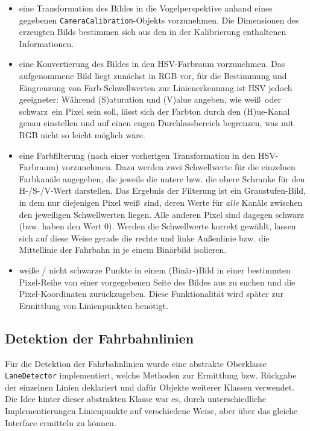 \begin{itemize}
	\item eine Transformation des Bildes in die Vogelperspektive anhand eines gegebenen
	\texttt{CameraCalibration}-Objekts vorzunehmen. Die Dimensionen des erzeugten Bilds bestimmen sich aus
	den in der Kalibrierung enthaltenen Informationen.
	\item eine Konvertierung des Bildes in den HSV-Farbraum vorzunehmen. Das aufgenommene Bild liegt
	zun\"achst in RGB vor, f\"ur die Bestimmung und Eingrenzung von Farb-Schwellwerten zur Linienerkennung
	ist HSV jedoch geeigneter: W\"ahrend (S)aturation und (V)alue angeben,
	wie \glqq wei\ss \grqq\ oder \glqq schwarz\grqq\ ein Pixel
	sein soll, l\"asst sich der Farbton durch den (H)ue-Kanal genau einstellen und auf einen engen
	Durchlassbereich begrenzen, was mit RGB nicht so leicht m\"oglich w\"are.
	\item eine Farbfilterung (nach einer vorherigen Transformation in den HSV-Farbraum) vorzunehmen. Dazu
	werden zwei Schwellwerte f\"ur die einzelnen Farbkan\"ale angegeben, die jeweils die untere bzw. die
	obere Schranke f\"ur den H-/S-/V-Wert darstellen. Das Ergebnis der Filterung ist ein Graustufen-Bild,
	in dem nur diejenigen Pixel wei\ss\ sind, deren Werte f\"ur \textit{alle} Kan\"ale zwischen den
	jeweiligen Schwellwerten liegen. Alle anderen Pixel sind dagegen schwarz (bzw. haben den Wert 0).
	Werden die Schwellwerte korrekt gew\"ahlt, lassen sich auf diese Weise gerade die rechte und linke
	Au\ss enlinie bzw. die Mittellinie der Fahrbahn in je einem Bin\"arbild isolieren.
	\item wei\ss e / nicht schwarze Punkte in einem (Bin\"ar-)Bild in einer bestimmten Pixel-Reihe
	von einer vorgegebenen Seite des Bildes aus zu suchen und die Pixel-Koordinaten zur\"uckzugeben.
	Diese Funktionalit\"at wird sp\"ater zur Ermittlung von Linienpunkten ben\"otigt.
\end{itemize} 


\subsection{Detektion der Fahrbahnlinien}

F\"ur die Detektion der Fahrbahnlinien wurde eine abstrakte Oberklasse \texttt{LaneDetector} implementiert,
welche Methoden zur Ermittlung bzw. R\"uckgabe der einzelnen Linien deklariert und daf\"ur Objekte
weiterer Klassen verwendet. Die Idee hinter dieser
abstrakten Klasse war es, durch unterschiedliche Implementierungen Linienpunkte auf verschiedene Weise,
aber \"uber das gleiche Interface ermitteln zu k\"onnen.\\

